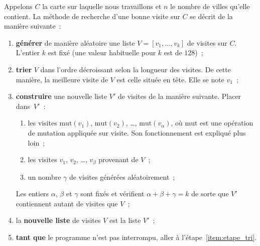\documentclass[12pt]{article}
\theoremstyle{definition}
\newcommand{\Mut}{\mathrm{mut}}
\begin{document}
Appelons $C$ la carte sur laquelle nous travaillons et $n$ le nombre de
villes qu'elle contient. La méthode de recherche d'une bonne visite sur
$C$ se décrit de la manière suivante~:
\begin{enumerate}
    \item {\bf générer} de manière aléatoire une liste $V = [v_1, \dots, v_k]$
    de visites sur $C$. L'entier $k$ est fixé (une valeur habituelle pour
    $k$ est de $128$)~;
    \smallskip

    \item \label{item:etape_tri}
    {\bf trier} $V$ dans l'ordre décroissant selon la longueur des visites.
    De cette manière, la meilleure visite de $V$ est celle située en
    tête. Elle se note $v_1$~;
    \smallskip

    \item {\bf construire} une nouvelle liste $V'$ de visites de la manière
    suivante. Placer dans~$V'$~:
    \begin{enumerate}
        \item les visites $\Mut(v_1)$, $\Mut(v_2)$, \dots,
        $\Mut(v_{\alpha})$, où $\Mut$ est une opération de mutation
        appliquée sur visite. Son fonctionnement est expliqué plus loin~;
        \item les visites $v_1$, $v_2$, \dots, $v_\beta$ provenant de $V$~;
        \item un nombre $\gamma$ de visites générées aléatoirement~;
    \end{enumerate}
    Les entiers $\alpha$, $\beta$ et $\gamma$ sont fixés et vérifient
    $\alpha + \beta + \gamma = k$ de sorte que $V'$ contiennent autant
    de visites que $V$~;
    \smallskip

    \item la {\bf nouvelle liste} de visites $V$ est la liste $V'$~;
    \smallskip

    \item {\bf tant que} le programme n'est pas interrompu, aller à
    l'étape~\ref{item:etape_tri}.
\end{enumerate}
\medskip
\end{document}
